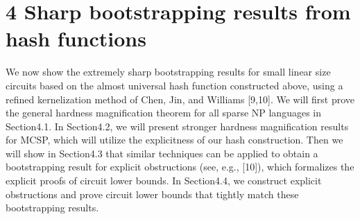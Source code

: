 \section*{4 Sharp bootstrapping results from hash functions}
We now show the extremely sharp bootstrapping results for small linear size circuits based on the almost universal hash function constructed above, using a refined kernelization method of Chen, Jin, and Williams [9,10].
We will first prove the general hardness magnification theorem for all sparse NP languages in Section4.1. In Section4.2, we will present stronger hardness magnification results for MCSP, which will utilize the explicitness of our hash construction. Then we will show in Section4.3 that similar techniques can be applied to obtain a bootstrapping result for explicit obstructions (see, e.g., [10]), which formalizes the explicit proofs of circuit lower bounds. In Section4.4, we construct explicit obstructions and prove circuit lower bounds that tightly match these bootstrapping results.
